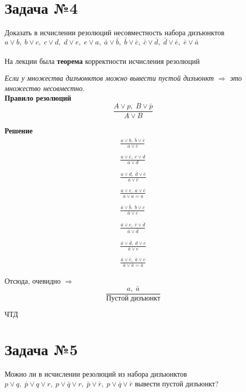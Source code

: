\documentclass[a4paper, 12pt]{article} %
\begin{document}
\section*{Задача №4}
Доказать в исчислении резолюций несовместность набора
дизъюнктов $a \vee b, \; b \vee c, \; c \vee d, \; d \vee e, \; e \vee a, \;
 \bar a \vee \bar b, \; \bar b \vee \bar c, \; \bar c \vee \bar d, \; 
 \bar d \vee \bar e, \; \bar e \vee \bar a $  \\ \\
 На лекции была \textbf{теорема} корректности исчисления резолюций 

 \textit{Если у множества дизъюнктов можно вывести пустой дизъюнкт $\Rightarrow$
это множество несовместно.}\\

\textbf{Правило резолюций}
\[
    \frac{A \vee p, \; B \vee \bar{p}}{A \vee B}
\]

\textbf{Решение}
\begin{align*}
    \frac{a \vee b, \; \bar{b} \vee \bar{c}}{a \vee \bar c} \\ \\
    \frac{a \vee \bar c, \; c \vee d}{ a \vee d} \\ \\
    \frac{a \vee d, \; \bar{d} \vee \bar{e}}{ a \vee \bar e} \\ \\
    \frac{a \vee e, \; a \vee \bar{e}}{a \vee a  = a} \\ \\
    \frac{\bar a \vee \bar b, \; b \vee c}{\bar a \vee c} \\ \\
    \frac{\bar a \vee  c, \; \bar c \vee \bar d}{ \bar a \vee \bar d} \\ \\
    \frac{\bar a \vee \bar d, \; d \vee e}{\bar a \vee  e} \\ \\
    \frac{\bar a \vee \bar e, \; \bar a \vee e}{\bar a \vee \bar a  = \bar{a}}
\end{align*}

Отсюда, очевидно $\Rightarrow$
\[
\frac{a, \; \bar{a}}{Пустой \;дизъюнкт}
\]

ЧТД
 
\section*{Задача №5}
Можно ли в исчислении резолюций из набора дизъюнктов 
$p \vee q, \; \bar p \vee q \vee r, \; p \vee \bar q \vee r, \;
\bar p \vee \bar r, \; p \vee \bar q \vee \bar r$
вывести пустой дизъюнкт?
\end{document}
